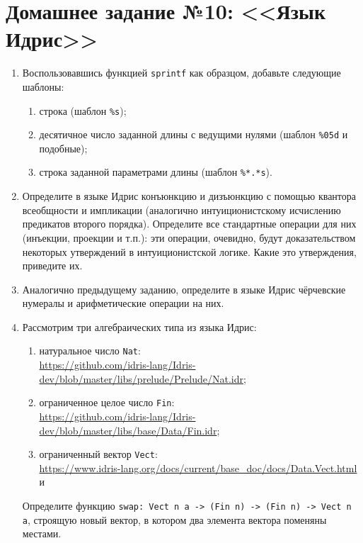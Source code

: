 \documentclass[10pt,a4paper,oneside]{article}
\begin{document}
\section*{Домашнее задание №10: <<Язык Идрис>>}

\begin{enumerate}
\item Воспользовавшись функцией \verb!sprintf! как образцом, добавьте  
следующие шаблоны:
\begin{enumerate}
\item строка (шаблон \verb!%s!);
\item десятичное число заданной длины с ведущими нулями (шаблон \verb!%05d! и подобные);
\item строка заданной параметрами длины (шаблон \verb!%*.*s!).
\end{enumerate}

\item Определите в языке Идрис конъюнкцию и дизъюнкцию с помощью
квантора всеобщности и импликации (аналогично интуиционистскому исчислению предикатов второго порядка).
Определите все стандартные операции для них (инъекции, проекции и т.п.):
эти операции, очевидно, будут доказательством некоторых утверждений в интуиционистской
логике. Какие это утверждения, приведите их.

\item Аналогично предыдущему заданию, определите в языке Идрис чёрчевские нумералы и арифметические операции на них.

\item Рассмотрим три алгебраических типа из языка Идрис: 
\begin{enumerate}
\item натуральное число \verb!Nat!:\\
\url{https://github.com/idris-lang/Idris-dev/blob/master/libs/prelude/Prelude/Nat.idr};
\item ограниченное целое число \verb!Fin!:\\
\url{https://github.com/idris-lang/Idris-dev/blob/master/libs/base/Data/Fin.idr};
\item ограниченный вектор \verb!Vect!:\\
\url{https://www.idris-lang.org/docs/current/base_doc/docs/Data.Vect.html} и
\end{enumerate}

Определите функцию \verb!swap: Vect n a -> (Fin n) -> (Fin n) -> Vect n a!,
строящую новый вектор, в котором два элемента вектора поменяны местами.


\end{enumerate}
\end{document}
